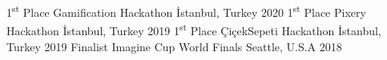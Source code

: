 
\vspace*{-1.5mm}

\begin{cvhonors}
  \cvhonor
    {1\textsuperscript{st} Place}
    {Gamification Hackathon}
    {İstanbul, Turkey}
    {2020}
  \cvhonor
   {1\textsuperscript{st} Place}
   {Pixery Hackathon}
   {İstanbul, Turkey}
   {2019}
  \cvhonor
    {1\textsuperscript{st} Place}
    {ÇiçekSepeti Hackathon}
    {İstanbul, Turkey}
    {2019}
  \cvhonor
    {Finalist}%
    {Imagine Cup World Finals}%
    {Seattle, U.S.A}%
    {2018}%

\end{cvhonors}
